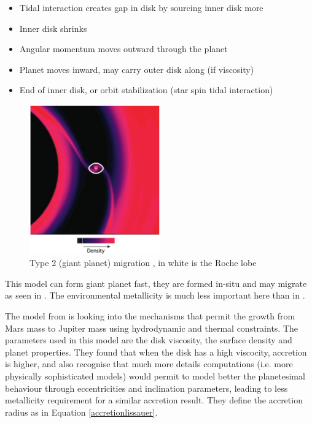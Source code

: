 \documentclass[12pt]{article} %
\begin{document}
\begin{itemize}
\setlength\itemsep{0em}
\item Tidal interaction creates gap in disk by sourcing inner disk more
\item Inner disk shrinks
\item Angular momentum moves outward through the planet
\item Planet moves inward, may carry outer disk along (if viscosity)
\item End of inner disk, or orbit stabilization (star spin tidal interaction)
\end{itemize}

\begin{figure}
\begin{center}
 \includegraphics[width=0.5\textwidth,keepaspectratio=true]{./images/chambers2009}
 \caption{Type 2 (giant planet) migration \cite{chambers2009planetary}, in white is the Roche lobe}
 \label{chambers2009}
\end{center}
\end{figure}


\noindent This model can form giant planet fast, they are formed in-situ and may migrate as seen in \cite{chambers2009planetary}. The environmental metallicity is much less important here than in \cite{pollack1996formation}.\newline

\noindent The model from \cite{lissauer2009models} is looking into the mechanisms that permit the growth from Mars mass to Jupiter mass using hydrodynamic and thermal constraints. The parameters used in this model are the disk viscosity, the surface density and planet properties. They found that when the disk has a high viscocity, accretion is higher, and also recognise that much more details computations (i.e. more physically sophisticated models) would permit to model better the planetesimal behaviour through eccentricities and inclination parameters, leading to less metallicity requirement for a similar accretion result. They define the accretion radius as in Equation \ref{accretionlissauer}.\newline
\end{document}
